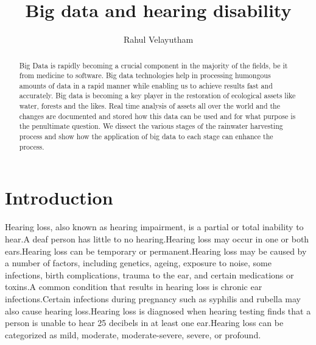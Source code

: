 \documentclass[sigconf]{acmart}
\begin{document}
\title{Big data and hearing disability}


\author{Rahul Velayutham}

\renewcommand{\shortauthors}{R. Velayutham}


\begin{abstract}
Big Data is rapidly becoming a crucial component in the majority of the fields, be it from medicine to software. Big data technologies help in processing humongous amounts of data in a rapid manner while enabling us to achieve results fast and accurately. Big data is becoming a key player in the restoration of ecological assets like water, forests and the likes. Real time analysis of assets all over the world and the changes are documented and stored how this data can be used and for what purpose is the penultimate question. We dissect the various stages of the rainwater harvesting process and show how the application of big data to each stage can enhance the process.
\end{abstract}



\maketitle



\section{Introduction}

Hearing loss, also known as hearing impairment, is a partial or total inability to hear.A deaf person has little to no hearing.Hearing loss may occur in one or both ears.Hearing loss can be temporary or permanent.Hearing loss may be caused by a number of factors, including genetics, ageing, exposure to noise, some infections, birth complications, trauma to the ear, and certain medications or toxins.A common condition that results in hearing loss is chronic ear infections.Certain infections during pregnancy such as syphilis and rubella may also cause hearing loss.Hearing loss is diagnosed when hearing testing finds that a person is unable to hear 25 decibels in at least one ear.Hearing loss can be categorized as mild, moderate, moderate-severe, severe, or profound\cite{Wikipedia2017}.
\end{document}
